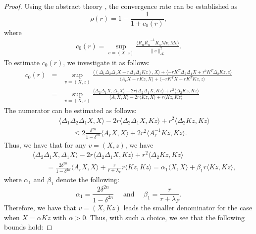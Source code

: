\documentclass{article}
\theoremstyle{definition}
\begin{document}
\begin{proof}
Using the abstract theory \cite{xu2002method}, the convergence rate can be established as 
\begin{equation}
\rho(r) = 1 - \frac{1}{1 + c_0(r)},
\end{equation}
where 
\begin{eqnarray}
c_0(r) = \sup_{v = (X,z)} \frac{\langle R_n \overline{R_n}^{-1} R_n Mv, Mv \rangle}{\|v\|_{\mathcal{A}_r}^2}.
\end{eqnarray}
To estimate $c_0(r)$, we investigate it as follows:
\begin{eqnarray*}
c_0(r) &=& \sup_{v = (X,z)} \frac{\langle (\Delta_1 \Delta_2 \Delta_1 X - r\Delta_1\Delta_2 Kz), X \rangle + \langle -rK^T \Delta_2 \Delta_1 X + r^2 K^T \Delta_2 Kz, z\rangle} {\langle A_r X - rKz, X \rangle + \langle -rK^T X + rK^T Kz, z\rangle } \\
&=& \sup_{v = (X,z)} \frac{\langle \Delta_2 \Delta_1 X, \Delta_1 X \rangle  - 2r \langle \Delta_2\Delta_1X,Kz\rangle + r^2 \langle \Delta_2 Kz, K z\rangle}{\langle A_r X,X\rangle - 2r \langle Kz, X \rangle + r\langle Kz, Kz\rangle } 
\end{eqnarray*}
The numerator can be estimated as follows:
\begin{eqnarray*}
&& \langle \Delta_1 \Delta_2 \Delta_1 X, X \rangle  - 2r \langle \Delta_2\Delta_1X,Kz\rangle + r^2 \langle \Delta_2 Kz, K z\rangle \\
&& \qquad \leq 2 \frac{\delta^{2n}}{1 - \delta^{2n}} \langle A_r X, X\rangle + 2 r^2 \langle A_r^{-1}Kz,Kz\rangle. 
\end{eqnarray*}
Thus, we have that for any $v = (X,z)$, we have 
\begin{eqnarray*}
&& \langle \Delta_2 \Delta_1 X, \Delta_1 X \rangle  - 2r \langle \Delta_2\Delta_1X,Kz\rangle + r^2 \langle \Delta_2 Kz, K z\rangle \\
&& \qquad = \frac{2 \delta^{2n}}{1 - \delta^{2n}} \langle A_r X,X\rangle + \frac{r}{r+\lambda_F} r \langle Kz, Kz\rangle = \alpha_1 \langle X, X\rangle + \beta_1 r \langle Kz,Kz\rangle, 
\end{eqnarray*}
where $\alpha_1$ and $\beta_1$ denote the following: 
\begin{equation} 
\alpha_1 = \frac{2 \delta^{2n}}{1 - \delta^{2n}} \quad \mbox{ and } \quad \beta_1 =  \frac{r}{r+\lambda_F}. 
\end{equation} 
Therefore, we have that $v = (X,Kz)$ leads the smaller denominator for the case when $X = \alpha Kz$ with $\alpha > 0$. Thus, with such a choice, we see that the following bounds hold: 

\end{proof}
\end{document}
